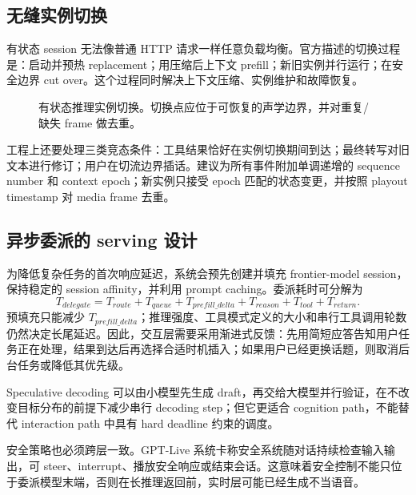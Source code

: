 \subsection{无缝实例切换}

有状态 session 无法像普通 HTTP 请求一样任意负载均衡。官方描述的切换过程是：启动并预热 replacement；用压缩后上下文 prefill；新旧实例并行运行；在安全边界 cut over。这个过程同时解决上下文压缩、实例维护和故障恢复。

\begin{figure}[H]
\centering
{}
\caption{有状态推理实例切换。切换点应位于可恢复的声学边界，并对重复/缺失 frame 做去重。}
\end{figure}

工程上还要处理三类竞态条件：工具结果恰好在实例切换期间到达；最终转写对旧文本进行修订；用户在切流边界插话。建议为所有事件附加单调递增的 sequence number 和 context epoch；新实例只接受 epoch 匹配的状态变更，并按照 playout timestamp 对 media frame 去重。

\subsection{异步委派的 serving 设计}

\FOne 为降低复杂任务的首次响应延迟，系统会预先创建并填充 frontier-model session，保持稳定的 session affinity，并利用 prompt caching\cite{openai2026continuous}。委派耗时可分解为
\begin{equation}
T_{delegate}=T_{route}+T_{queue}+T_{prefill\_delta}+T_{reason}+T_{tool}+T_{return}.
\end{equation}
预填充只能减少 $T_{prefill\_delta}$；推理强度、工具模式定义的大小和串行工具调用轮数仍然决定长尾延迟。因此，交互层需要采用渐进式反馈：先用简短应答告知用户任务正在处理，结果到达后再选择合适时机插入；如果用户已经更换话题，则取消后台任务或降低其优先级。

Speculative decoding 可以由小模型先生成 draft，再交给大模型并行验证，在不改变目标分布的前提下减少串行 decoding step\cite{leviathan2023speculative}；但它更适合 cognition path，不能替代 interaction path 中具有 hard deadline 约束的调度。

安全策略也必须跨层一致。GPT-Live 系统卡称安全系统随对话持续检查输入输出，可 steer、interrupt、播放安全响应或结束会话\cite{openai2026safety}。这意味着安全控制不能只位于委派模型末端，否则在长推理返回前，实时层可能已经生成不当语音。
